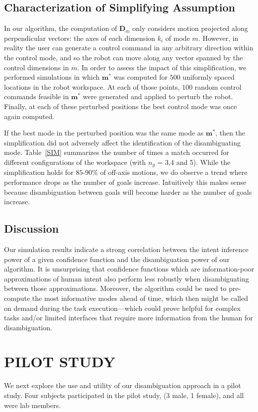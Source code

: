 \documentclass[conference]{IEEEtran}
\begin{document}
\subsection{Characterization of Simplifying Assumption}
In our algorithm, the computation of $\boldsymbol{D}_{m}$ only considers motion projected along perpendicular vectors: the axes of each dimension $k_i$ of mode $m$. However, in reality the user can generate a control command in any arbitrary direction within the control mode, and so the robot can move along any vector spanned by the control dimensions in $m$. In order to assess the impact of this simplification, we performed simulations in which $\boldsymbol{m}^*$ was computed for $500$ uniformly spaced locations in the robot workspace. At each of those points, $100$ random control commands feasible in $\boldsymbol{m}^*$ were generated and applied to perturb the robot. Finally, at each of these perturbed positions the best control mode was once again computed. 

If the best mode in the perturbed position was the same mode as $\boldsymbol{m}^*$, then the simplification did not adversely affect the identification of the disambiguating mode. Table~\ref{SIM} summarizes the number of times a match occurred for different configurations of the workspace (with $n_g$ = 3,4 and 5). While the simplification holds for $85$-$90\%$ of off-axis motions, we do observe a trend where performance drops as the number of goals increase. Intuitively this makes sense because disambiguation between goals will become harder as the number of goals increase. 
 
 \subsection{Discussion}
Our simulation results indicate a strong correlation between the intent inference power of a given confidence function and the disambiguation power of our algorithm. It is unsurprising that confidence functions which are information-poor approximations of human intent also perform less robustly when disambiguating between those approximations.
 Moreover, the algorithm could be used to pre-compute the most informative modes ahead of time, which then might be called on demand during the task execution---which could prove helpful for complex tasks and/or limited interfaces that require more information from the human for disambiguation. 
 \section{PILOT STUDY} \label{EXP}
 We next explore the use and utility of our disambiguation approach in a pilot study. Four subjects participated in the pilot study, (3 male, 1 female), and all were lab members.
\end{document}
